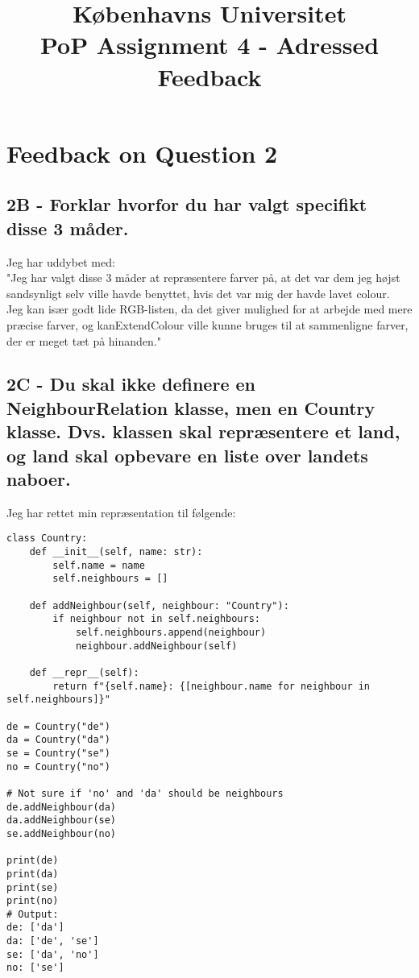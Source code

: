 \documentclass[a4paper,12pt]{article}
\begin{document}
% 

\title{Københavns Universitet\\ 
PoP Assignment 4 - Adressed Feedback}
\maketitle %

\section{Feedback on Question 2}

\subsection*{2B - Forklar hvorfor du har valgt specifikt disse 3 måder.}
Jeg har uddybet med:\\
"Jeg har valgt disse 3 måder at repræsentere farver på, at det var dem jeg højst sandsynligt selv ville havde benyttet, hvis det var mig der havde lavet colour.\\
Jeg kan især godt lide RGB-listen, da det giver mulighed for at arbejde med mere præcise farver, og kanExtendColour ville kunne bruges til at sammenligne farver, der er meget tæt på hinanden."


\subsection*{2C - Du skal ikke definere en NeighbourRelation klasse, men en Country klasse. Dvs. klassen skal repræsentere et land, og land skal opbevare en liste over landets naboer.}
Jeg har rettet min repræsentation til følgende:

\begin{lstlisting}
class Country:
    def __init__(self, name: str):
        self.name = name
        self.neighbours = []

    def addNeighbour(self, neighbour: "Country"):
        if neighbour not in self.neighbours:
            self.neighbours.append(neighbour)
            neighbour.addNeighbour(self)

    def __repr__(self):
        return f"{self.name}: {[neighbour.name for neighbour in self.neighbours]}"

de = Country("de")
da = Country("da")
se = Country("se")
no = Country("no")

# Not sure if 'no' and 'da' should be neighbours
de.addNeighbour(da)
da.addNeighbour(se)
se.addNeighbour(no)

print(de)
print(da)
print(se)
print(no)
# Output:
de: ['da']
da: ['de', 'se']
se: ['da', 'no']
no: ['se']
\end{lstlisting}
\end{document}
